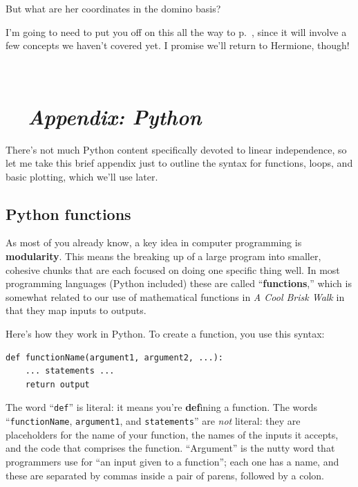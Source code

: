 But what are her coordinates in the domino basis?


I'm going to need to put you off on this all the way to
p.~\pageref{changeOfBasisOtherWayFinally}, since it will involve a few concepts
we haven't covered yet. I promise we'll return to Hermione, though!

\vspace{.1in}
\hrulefill \\

\pagebreak

\section*{\faPython \ \ \textit{Appendix: Python}}

There's not much Python content specifically devoted to linear independence, so
let me take this brief appendix just to outline the syntax for functions,
loops, and basic plotting, which we'll use later.

\subsection*{Python functions}


As most of you already know, a key idea in computer programming is
\textbf{modularity}. This means the breaking up of a large program into
smaller, cohesive chunks that are each focused on doing one specific thing
well. In most programming languages (Python included) these are called
``\textbf{functions},'' which is somewhat related to our use of mathematical
functions in \textit{A Cool Brisk Walk} in that they map inputs to outputs.

Here's how they work in Python. To create a function, you use this syntax:

\begin{Verbatim}[fontsize=\small,samepage=true,frame=single,framesep=3mm]
def functionName(argument1, argument2, ...):
    ... statements ...
    return output
\end{Verbatim}


The word ``\texttt{def}'' is literal: it means you're \textbf{def}ining a
function. The words ``\texttt{functionName}, \texttt{argument1}, and
\texttt{statements}'' are \textit{not} literal: they are placeholders for the
name of your function, the names of the inputs it accepts, and the code that
comprises the function. ``Argument'' is the nutty word that programmers use for
``an input given to a function''; each one has a name, and these are separated
by commas inside a pair of parens, followed by a colon.

